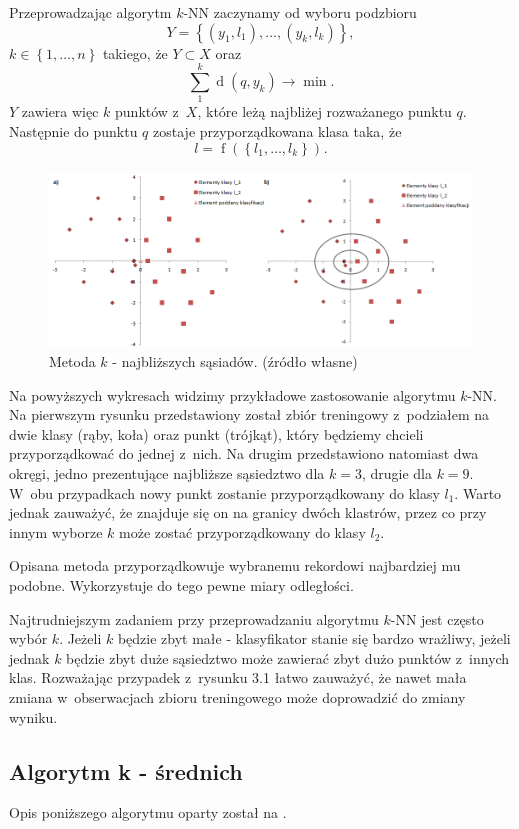 \documentclass[12pt,a4paper]{report}
\newcommand{\set}[1]{\left\lbrace {#1} \right\rbrace}
\newcommand{\distance}[2]{\operatorname{d}\left({#1}, {#2} \right)}
\newcommand{\f}[2][]{\operatorname{f}\left( {#2} \right)_{#1}}
\begin{document}
Przeprowadzając algorytm $k$-NN zaczynamy od wyboru podzbioru
$$
\mathit{Y}=\set{(y_1,l_1),\ldots,(y_k,l_k)}, 
$$
$k\in\set{1,\ldots,n}$ takiego, że $\mathit{Y} \subset \mathit{X}$ oraz 
$$
\sum_1^k \distance{q}{y_k} \to \min.
$$ 
$\mathit{Y}$ zawiera więc $k$ punktów z~$\mathit{X}$, które leżą najbliżej rozważanego punktu $q$. Następnie do punktu $q$ zostaje przyporządkowana klasa taka, że $$
l=\f{\set{l_1,\ldots,l_k}}.
$$
\begin{center}
\begin{figure}[H]
\centering
\includegraphics[scale=0.5]{obrazy/kNN.PNG} 
\caption{Metoda $k$ - najbliższych sąsiadów. (źródło własne)}
\end{figure}
\end{center}

Na powyższych wykresach widzimy przykładowe zastosowanie algorytmu $k$-NN. Na pierwszym rysunku przedstawiony został zbiór treningowy z~podziałem na dwie klasy (rąby, koła) oraz punkt (trójkąt), który będziemy chcieli przyporządkować do jednej z~nich. Na drugim przedstawiono natomiast dwa okręgi, jedno prezentujące najbliższe sąsiedztwo dla $k = 3$, drugie dla $k = 9$. W~obu przypadkach nowy punkt zostanie przyporządkowany do klasy $l_1$. Warto jednak zauważyć, że znajduje się on na granicy dwóch klastrów, przez co przy innym wyborze $k$ może zostać przyporządkowany do klasy $l_2$.

Opisana metoda przyporządkowuje wybranemu rekordowi najbardziej mu podobne. Wykorzystuje do tego pewne miary odległości.

Najtrudniejszym zadaniem przy przeprowadzaniu algorytmu $k$-NN jest często wybór $k$. Jeżeli $k$ będzie zbyt małe - klasyfikator stanie się bardzo wrażliwy, jeżeli jednak $k$ będzie zbyt duże sąsiedztwo może zawierać zbyt dużo punktów z~innych klas. Rozważając przypadek z~rysunku 3.1 łatwo zauważyć, że nawet mała zmiana w~obserwacjach zbioru treningowego może doprowadzić do zmiany wyniku.

\subsection{Algorytm k - średnich} 
Opis poniższego algorytmu oparty został na {\citep[Sec 2.3.1]{ascgdpds}}.
\end{document}
